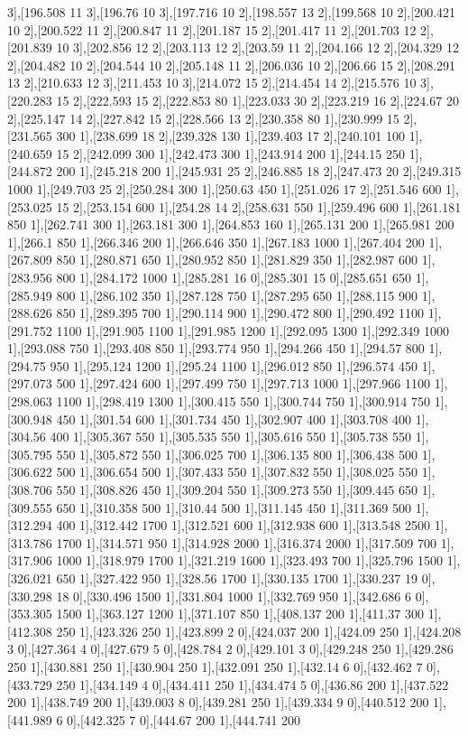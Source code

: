 {3],[196.508 11 3],[196.76 10 3],[197.716 10 2],[198.557 13 2],[199.568 10 2],[200.421 10 2],[200.522 11 2],[200.847 11 2],[201.187 15 2],[201.417 11 2],[201.703 12 2],[201.839 10 3],[202.856 12 2],[203.113 12 2],[203.59 11 2],[204.166 12 2],[204.329 12 2],[204.482 10 2],[204.544 10 2],[205.148 11 2],[206.036 10 2],[206.66 15 2],[208.291 13 2],[210.633 12 3],[211.453 10 3],[214.072 15 2],[214.454 14 2],[215.576 10 3],[220.283 15 2],[222.593 15 2],[222.853 80 1],[223.033 30 2],[223.219 16 2],[224.67 20 2],[225.147 14 2],[227.842 15 2],[228.566 13 2],[230.358 80 1],[230.999 15 2],[231.565 300 1],[238.699 18 2],[239.328 130 1],[239.403 17 2],[240.101 100 1],[240.659 15 2],[242.099 300 1],[242.473 300 1],[243.914 200 1],[244.15 250 1],[244.872 200 1],[245.218 200 1],[245.931 25 2],[246.885 18 2],[247.473 20 2],[249.315 1000 1],[249.703 25 2],[250.284 300 1],[250.63 450 1],[251.026 17 2],[251.546 600 1],[253.025 15 2],[253.154 600 1],[254.28 14 2],[258.631 550 1],[259.496 600 1],[261.181 850 1],[262.741 300 1],[263.181 300 1],[264.853 160 1],[265.131 200 1],[265.981 200 1],[266.1 850 1],[266.346 200 1],[266.646 350 1],[267.183 1000 1],[267.404 200 1],[267.809 850 1],[280.871 650 1],[280.952 850 1],[281.829 350 1],[282.987 600 1],[283.956 800 1],[284.172 1000 1],[285.281 16 0],[285.301 15 0],[285.651 650 1],[285.949 800 1],[286.102 350 1],[287.128 750 1],[287.295 650 1],[288.115 900 1],[288.626 850 1],[289.395 700 1],[290.114 900 1],[290.472 800 1],[290.492 1100 1],[291.752 1100 1],[291.905 1100 1],[291.985 1200 1],[292.095 1300 1],[292.349 1000 1],[293.088 750 1],[293.408 850 1],[293.774 950 1],[294.266 450 1],[294.57 800 1],[294.75 950 1],[295.124 1200 1],[295.24 1100 1],[296.012 850 1],[296.574 450 1],[297.073 500 1],[297.424 600 1],[297.499 750 1],[297.713 1000 1],[297.966 1100 1],[298.063 1100 1],[298.419 1300 1],[300.415 550 1],[300.744 750 1],[300.914 750 1],[300.948 450 1],[301.54 600 1],[301.734 450 1],[302.907 400 1],[303.708 400 1],[304.56 400 1],[305.367 550 1],[305.535 550 1],[305.616 550 1],[305.738 550 1],[305.795 550 1],[305.872 550 1],[306.025 700 1],[306.135 800 1],[306.438 500 1],[306.622 500 1],[306.654 500 1],[307.433 550 1],[307.832 550 1],[308.025 550 1],[308.706 550 1],[308.826 450 1],[309.204 550 1],[309.273 550 1],[309.445 650 1],[309.555 650 1],[310.358 500 1],[310.44 500 1],[311.145 450 1],[311.369 500 1],[312.294 400 1],[312.442 1700 1],[312.521 600 1],[312.938 600 1],[313.548 2500 1],[313.786 1700 1],[314.571 950 1],[314.928 2000 1],[316.374 2000 1],[317.509 700 1],[317.906 1000 1],[318.979 1700 1],[321.219 1600 1],[323.493 700 1],[325.796 1500 1],[326.021 650 1],[327.422 950 1],[328.56 1700 1],[330.135 1700 1],[330.237 19 0],[330.298 18 0],[330.496 1500 1],[331.804 1000 1],[332.769 950 1],[342.686 6 0],[353.305 1500 1],[363.127 1200 1],[371.107 850 1],[408.137 200 1],[411.37 300 1],[412.308 250 1],[423.326 250 1],[423.899 2 0],[424.037 200 1],[424.09 250 1],[424.208 3 0],[427.364 4 0],[427.679 5 0],[428.784 2 0],[429.101 3 0],[429.248 250 1],[429.286 250 1],[430.881 250 1],[430.904 250 1],[432.091 250 1],[432.14 6 0],[432.462 7 0],[433.729 250 1],[434.149 4 0],[434.411 250 1],[434.474 5 0],[436.86 200 1],[437.522 200 1],[438.749 200 1],[439.003 8 0],[439.281 250 1],[439.334 9 0],[440.512 200 1],[441.989 6 0],[442.325 7 0],[444.67 200 1],[444.741 200 }
